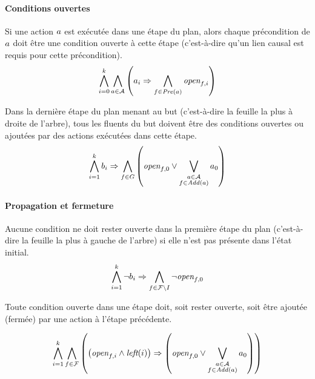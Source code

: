 \paragraph*{Conditions ouvertes}
Si une action $a$ est exécutée dans une étape du plan, alors chaque précondition de $a$ doit être une condition ouverte à cette étape (c'est-à-dire qu'un lien causal est requis pour cette précondition).
\[ \bigwedge\limits_{\substack{i=0}}^{k} \bigwedge\limits_{\substack{a \in \mathcal{A}}} \left(a_{i} \Rightarrow \bigwedge\limits_{\substack{f\in \mathit{Pre}(a)}} \textit{open}_{f,i}\right) \]

Dans la dernière étape du plan menant au but (c'est-à-dire la feuille la plus à droite de l'arbre), tous les fluents du but doivent être des conditions ouvertes ou ajoutées par des actions exécutées dans cette étape.
\[ \bigwedge\limits_{\substack{i=1}}^{k}b_{i} \Rightarrow \bigwedge\limits_{\substack{f\in G}} \left(\textit{open}_{f,0} \vee \bigvee\limits_{\substack{a \in \mathcal{A} \\ f \in \mathit{Add}(a)}} a_{0}\right) \]

\paragraph*{Propagation et fermeture}

Aucune condition ne doit rester ouverte dans la première étape du plan (c'est-à-dire la feuille la plus à gauche de l'arbre) si elle n'est pas présente dans l'état initial.
\[ \bigwedge\limits_{\substack{i=1}}^{k}\neg b_{i} \Rightarrow \bigwedge\limits_{\substack{f\in \mathcal{F}\setminus I}} \neg \textit{open}_{f,0} \]	

Toute condition ouverte dans une étape doit, soit rester ouverte, soit être ajoutée (fermée) par une action à l'étape précédente.

\[ \bigwedge\limits_{\substack{i=1}}^{k} \bigwedge\limits_{\substack{f\in \mathcal{F}}} \left(\left(\textit{open}_{f,i} \wedge \textit{left}(i) \right) \Rightarrow \left(\textit{open}_{f,0} \vee \bigvee\limits_{\substack{a \in \mathcal{A} \\ f \in \mathit{Add}(a)}} a_{0}\right)\right) \]

